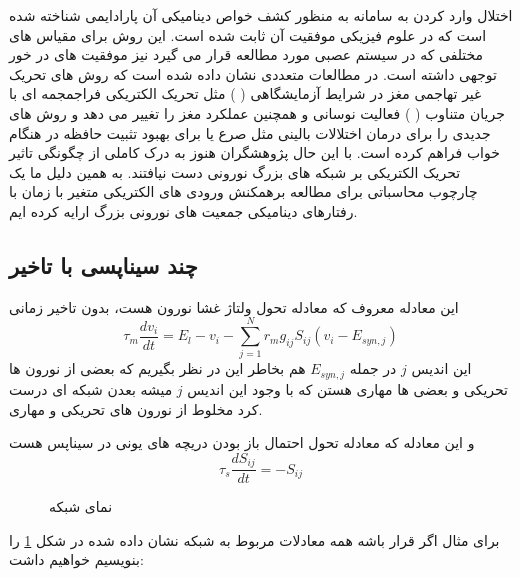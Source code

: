 اختلال وارد کردن به سامانه به منظور کشف خواص دینامیکی آن پارادایمی شناخته شده است که در علوم فیزیکی موفقیت آن ثابت شده است. این روش برای مقیاس های مختلفی که در سیستم عصبی مورد مطالعه قرار می گیرد نیز موفقیت های در خور توجهی داشته است. در مطالعات متعددی نشان داده شده است که روش های تحریک غیر تهاجمی مغز در شرایط آزمایشگاهی (
)
مثل تحریک الکتریکی فراجمجمه ای با جریان متناوب (
)
فعالیت نوسانی و همچنین عملکرد مغز را تغییر می دهد و روش های جدیدی را برای درمان اختلالات بالینی مثل صرع یا برای بهبود تثبیت حافظه در هنگام خواب فراهم کرده است. با این حال پژوهشگران هنوز به درک کاملی از چگونگی تاثیر تحریک الکتریکی بر شبکه های بزرگ نورونی دست نیافتند. به همین دلیل ما یک چارچوب محاسباتی برای مطالعه برهمکنش ورودی های الکتریکی متغیر با زمان با رفتارهای دینامیکی جمعیت های نورونی بزرگ ارایه کرده ایم.


\subsection*{چند سیناپسی با تاخیر}
این معادله معروف که معادله تحول ولتاژ غشا نورون هست، بدون تاخیر زمانی 
\begin{equation}
    \tau_m \frac{dv_i}{dt}=E_l-v_i-\sum_{j=1}^{N} r_m g_{ij}S_{ij}(v_i-E_{syn,j})
\end{equation}
این اندیس
$j$
در جمله 
$E_{syn,j}$
هم بخاطر این در نظر بگیریم که بعضی از نورون ها تحریکی و بعضی ها مهاری هستن که با وجود این اندیس
$j$
میشه بعدن شبکه ای درست کرد مخلوط از نورون های تحریکی و مهاری.

و این معادله که معادله تحول احتمال باز بودن  دریچه های یونی در سیناپس هست
\begin{equation}
    \tau_s \frac{dS_{ij}}{dt}=-S_{ij}
\end{equation}

\begin{figure}
    \centering
    \caption{نمای شبکه}
    \label{fig:3neuron1}
\end{figure}
برای مثال اگر قرار باشه همه معادلات مربوط به شبکه نشان داده شده در شکل 
\ref{fig:3neuron1}
را بنویسیم خواهیم داشت:


